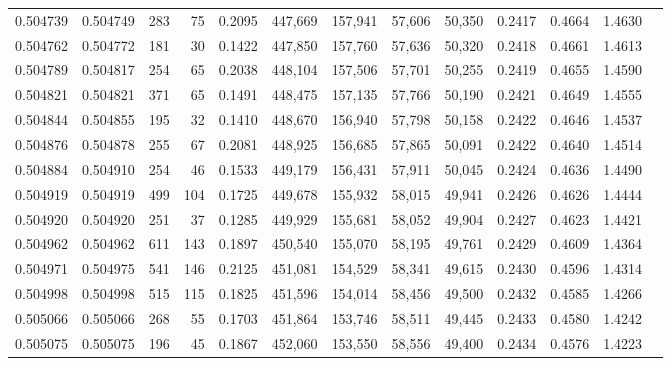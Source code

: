 \begin{tabular}{rrrrrrrrrrrrr}
0.504739 & 0.504749 &   283 &    75 &                                     0.2095 & 447,669 & 157,941 &  57,606 &  50,350 & 0.2417 & 0.4664 & 1.4630 \\
0.504762 & 0.504772 &   181 &    30 &                                     0.1422 & 447,850 & 157,760 &  57,636 &  50,320 & 0.2418 & 0.4661 & 1.4613 \\
0.504789 & 0.504817 &   254 &    65 &                                     0.2038 & 448,104 & 157,506 &  57,701 &  50,255 & 0.2419 & 0.4655 & 1.4590 \\
0.504821 & 0.504821 &   371 &    65 &                                     0.1491 & 448,475 & 157,135 &  57,766 &  50,190 & 0.2421 & 0.4649 & 1.4555 \\
0.504844 & 0.504855 &   195 &    32 &                                     0.1410 & 448,670 & 156,940 &  57,798 &  50,158 & 0.2422 & 0.4646 & 1.4537 \\
0.504876 & 0.504878 &   255 &    67 &                                     0.2081 & 448,925 & 156,685 &  57,865 &  50,091 & 0.2422 & 0.4640 & 1.4514 \\
0.504884 & 0.504910 &   254 &    46 &                                     0.1533 & 449,179 & 156,431 &  57,911 &  50,045 & 0.2424 & 0.4636 & 1.4490 \\
0.504919 & 0.504919 &   499 &   104 &                                     0.1725 & 449,678 & 155,932 &  58,015 &  49,941 & 0.2426 & 0.4626 & 1.4444 \\
0.504920 & 0.504920 &   251 &    37 &                                     0.1285 & 449,929 & 155,681 &  58,052 &  49,904 & 0.2427 & 0.4623 & 1.4421 \\
0.504962 & 0.504962 &   611 &   143 &                                     0.1897 & 450,540 & 155,070 &  58,195 &  49,761 & 0.2429 & 0.4609 & 1.4364 \\
0.504971 & 0.504975 &   541 &   146 &                                     0.2125 & 451,081 & 154,529 &  58,341 &  49,615 & 0.2430 & 0.4596 & 1.4314 \\
0.504998 & 0.504998 &   515 &   115 &                                     0.1825 & 451,596 & 154,014 &  58,456 &  49,500 & 0.2432 & 0.4585 & 1.4266 \\
0.505066 & 0.505066 &   268 &    55 &                                     0.1703 & 451,864 & 153,746 &  58,511 &  49,445 & 0.2433 & 0.4580 & 1.4242 \\
0.505075 & 0.505075 &   196 &    45 &                                     0.1867 & 452,060 & 153,550 &  58,556 &  49,400 & 0.2434 & 0.4576 & 1.4223 \\

\end{tabular}

